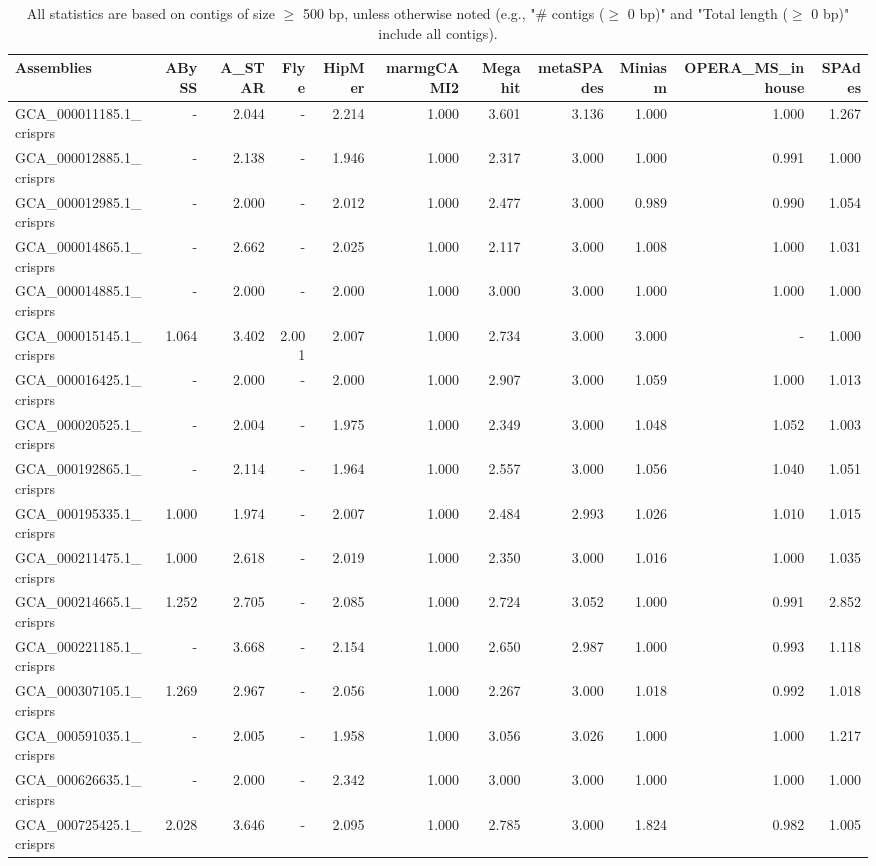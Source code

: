 \documentclass[12pt,a4paper]{article}
\begin{document}
\begin{table}[ht]
\begin{center}
\caption{All statistics are based on contigs of size $\geq$ 500 bp, unless otherwise noted (e.g., "\# contigs ($\geq$ 0 bp)" and "Total length ($\geq$ 0 bp)" include all contigs).}
\begin{tabular}{|l*{10}{|r}|}
\hline
Assemblies & ABySS & A\_STAR & Flye & HipMer & marmgCAMI2 & Megahit & metaSPAdes & Miniasm & OPERA\_MS\_inhouse & SPAdes \\ \hline
GCA\_000011185.1\_crisprs & - & 2.044 & - & 2.214 & 1.000 & 3.601 & 3.136 & 1.000 & 1.000 & 1.267 \\ \hline
GCA\_000012885.1\_crisprs & - & 2.138 & - & 1.946 & 1.000 & 2.317 & 3.000 & 1.000 & 0.991 & 1.000 \\ \hline
GCA\_000012985.1\_crisprs & - & 2.000 & - & 2.012 & 1.000 & 2.477 & 3.000 & 0.989 & 0.990 & 1.054 \\ \hline
GCA\_000014865.1\_crisprs & - & 2.662 & - & 2.025 & 1.000 & 2.117 & 3.000 & 1.008 & 1.000 & 1.031 \\ \hline
GCA\_000014885.1\_crisprs & - & 2.000 & - & 2.000 & 1.000 & 3.000 & 3.000 & 1.000 & 1.000 & 1.000 \\ \hline
GCA\_000015145.1\_crisprs & 1.064 & 3.402 & 2.001 & 2.007 & 1.000 & 2.734 & 3.000 & 3.000 & - & 1.000 \\ \hline
GCA\_000016425.1\_crisprs & - & 2.000 & - & 2.000 & 1.000 & 2.907 & 3.000 & 1.059 & 1.000 & 1.013 \\ \hline
GCA\_000020525.1\_crisprs & - & 2.004 & - & 1.975 & 1.000 & 2.349 & 3.000 & 1.048 & 1.052 & 1.003 \\ \hline
GCA\_000192865.1\_crisprs & - & 2.114 & - & 1.964 & 1.000 & 2.557 & 3.000 & 1.056 & 1.040 & 1.051 \\ \hline
GCA\_000195335.1\_crisprs & 1.000 & 1.974 & - & 2.007 & 1.000 & 2.484 & 2.993 & 1.026 & 1.010 & 1.015 \\ \hline
GCA\_000211475.1\_crisprs & 1.000 & 2.618 & - & 2.019 & 1.000 & 2.350 & 3.000 & 1.016 & 1.000 & 1.035 \\ \hline
GCA\_000214665.1\_crisprs & 1.252 & 2.705 & - & 2.085 & 1.000 & 2.724 & 3.052 & 1.000 & 0.991 & 2.852 \\ \hline
GCA\_000221185.1\_crisprs & - & 3.668 & - & 2.154 & 1.000 & 2.650 & 2.987 & 1.000 & 0.993 & 1.118 \\ \hline
GCA\_000307105.1\_crisprs & 1.269 & 2.967 & - & 2.056 & 1.000 & 2.267 & 3.000 & 1.018 & 0.992 & 1.018 \\ \hline
GCA\_000591035.1\_crisprs & - & 2.005 & - & 1.958 & 1.000 & 3.056 & 3.026 & 1.000 & 1.000 & 1.217 \\ \hline
GCA\_000626635.1\_crisprs & - & 2.000 & - & 2.342 & 1.000 & 3.000 & 3.000 & 1.000 & 1.000 & 1.000 \\ \hline
GCA\_000725425.1\_crisprs & 2.028 & 3.646 & - & 2.095 & 1.000 & 2.785 & 3.000 & 1.824 & 0.982 & 1.005 \\ \hline
\end{tabular}
\end{center}
\end{table}
\end{document}
